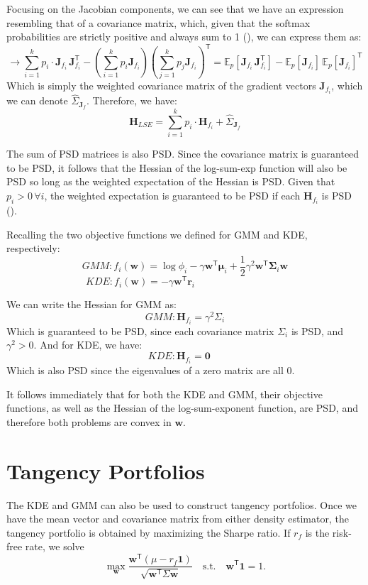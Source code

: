 Focusing on the Jacobian components, we can see that we have an expression resembling that of a covariance matrix, which, given that the softmax probabilities are strictly positive and always sum to 1 (\cite{boydConvexOptimization2004}), we can express them as:
$$\rightarrow \sum_{i=1}^{k}p_i\cdot\mathbf{J}_{f_i}^{}\,\mathbf{J}_{f_i}^{\mathsf{T}}-\left(\sum_{i=1}^{k}p_i\mathbf{J}_{f_i}\right)\left(\sum_{j=1}^{k}p_j\mathbf{J}_{f_i}\right)^{\mathsf{T}}=\mathbb{E}_{p}[\mathbf{J}_{f_i}^{}\,\mathbf{J}_{f_i}^{\mathsf{T}}]-\mathbb{E}_{p}[\mathbf{J}_{f_i}^{}]\,\mathbb{E}_{p}[\mathbf{J}_{f_i}^{}]^{\mathsf{T}}$$
Which is simply the weighted covariance matrix of the gradient vectors $\mathbf{J}_{f_i}$, which we can denote $\hat\Sigma_{\mathbf{J}_{f}}$. Therefore, we have:
$$\mathbf{H}_{LSE}=\sum_{i=1}^{k}p_i\cdot\mathbf{H}_{f_i}+\hat\Sigma_{\mathbf{J}_{f}}$$

The sum of PSD matrices is also PSD. Since the covariance matrix is guaranteed to be PSD, it follows that the Hessian of the log-sum-exp function will also be PSD so long as the weighted expectation of the Hessian is PSD. Given that $p_i>0\,\forall i$, the weighted expectation is guaranteed to be PSD if each $\mathbf{H}_{f_i}$ is PSD (\cite{hornMatrixAnalysis2017}).

Recalling the two objective functions we defined for GMM and KDE, respectively:
$$GMM:f_i(\mathbf{w})=\log{\phi_{i}}-\gamma\mathbf{w}^{\mathsf{T}}\mathbf{\mu}_i+\frac{1}{2}\gamma^2\mathbf{w}^{\mathsf{T}}\mathbf{\Sigma}_i\mathbf{w}$$
$$KDE:f_i(\mathbf{w})=-\gamma\mathbf{w}^{\mathsf{T}}\mathbf{r}_i\qquad \qquad \qquad \qquad \quad $$

We can write the Hessian for GMM as:
$$GMM:\mathbf{H}_{f_i}=\gamma^{2}\Sigma_i$$
Which is guaranteed to be PSD, since each covariance matrix $\Sigma_i$ is PSD, and $\gamma^2>0$. And for KDE, we have:
$$KDE:\mathbf{H}_{f_i}=\mathbf{0}\quad\,$$
Which is also PSD since the eigenvalues of a zero matrix are all $0$.

It follows immediately that for both the KDE and GMM, their objective functions, as well as the Hessian of the log-sum-exponent function, are PSD, and therefore both problems are convex in $\mathbf{w}$.

\section{Tangency Portfolios}
\label{sec:tangency}
The KDE and GMM can also be used to construct tangency portfolios. Once we have the mean vector and covariance matrix from either density estimator, the tangency portfolio is obtained by maximizing the Sharpe ratio. If $r_f$ is the risk-free rate, we solve
$$
\max_{\mathbf w}
\frac{\mathbf w^{\mathsf{T}}(\mu - r_f\mathbf1)}
{\sqrt{\mathbf w^{\mathsf{T}}\Sigma\mathbf w}}
\quad\text{s.t.}\quad \mathbf w^{\mathsf{T}}\mathbf1=1.
$$

